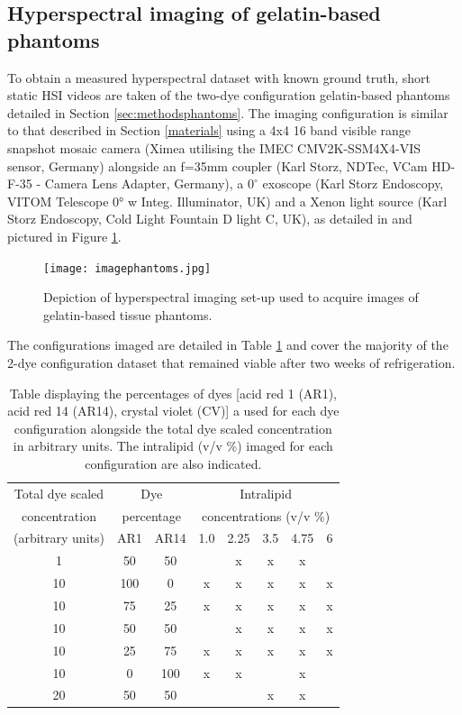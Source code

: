 \subsection{Hyperspectral imaging of gelatin-based phantoms}\label{sec:imagingphantoms}
To obtain a measured hyperspectral dataset with known ground truth, short static HSI videos are taken of the two-dye configuration gelatin-based phantoms detailed in Section \ref{sec:methodsphantoms}. The imaging configuration is similar to that described in Section \ref{materials} using a 4x4 16 band visible range snapshot mosaic camera (Ximea utilising the IMEC CMV2K-SSM4X4-VIS sensor, Germany) alongside an f=35mm coupler (Karl Storz, NDTec, VCam HD-F-35 - Camera Lens Adapter, Germany), a $0^\circ$ exoscope (Karl Storz Endoscopy, VITOM Telescope 0° w Integ. Illuminator, UK) and a Xenon light source (Karl Storz Endoscopy, Cold Light Fountain D light C, UK), as detailed in \citet{Ebner2021} and pictured in Figure \ref{fig:imagephantoms}.
\begin{figure}[h!]
    \centering
    \texttt{[image: imagephantoms.jpg]}
    \caption{Depiction of hyperspectral imaging set-up used to acquire images of gelatin-based tissue phantoms.}
    \label{fig:imagephantoms}
\end{figure}
The configurations imaged are detailed in Table \ref{tb:imagedphantoms} and cover the majority of the 2-dye configuration dataset that remained viable after two weeks of refrigeration. 
\begin{table}[ht!]
    \centering
    \caption{Table displaying the percentages of dyes [acid red 1 (AR1), acid red 14 (AR14), crystal violet (CV)] a used for each dye configuration alongside the total dye scaled concentration in arbitrary units. The intralipid (v/v \%) imaged for each configuration are also indicated.}
    \begin{tabular}{|c|c|c|c|c|c|c|c|}
        \hline
        Total dye scaled & \multicolumn{2}{|c|}{Dye } & \multicolumn{5}{c|}{Intralipid } \\
        concentration & \multicolumn{2}{|c|}{percentage} & \multicolumn{5}{c|}{concentrations (v/v \%)} \\
        (arbitrary units) & AR1 & AR14 & 1.0 & 2.25 & 3.5 & 4.75 & 6 \\
        \hline
        1 & 50 & 50 & & x & x & x & \\
        10 & 100 & 0 & x & x & x & x & x \\
        10 & 75 & 25 & x & x & x & x & x \\
        10 & 50 & 50 &  & x & x & x & x \\
        10 & 25 & 75 & x & x & x & x & x \\
        10 & 0 & 100 & x & x &  & x & \\
        20 & 50 & 50 &  & & x & x &  \\
        \hline
    \end{tabular}
    \label{tb:imagedphantoms}
\end{table}
